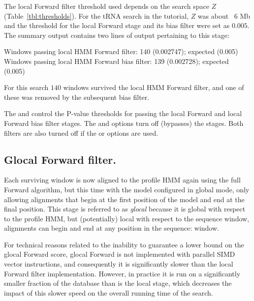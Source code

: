 \begin{sreoutput}
The local Forward filter threshold used depends on
the search space $Z$ (Table~\ref{tbl:thresholds}). For the tRNA search
in the tutorial, $Z$ was about ~$6$ Mb and the threshold for the local
Forward stage and its bias filter were set as $0.005$. The summary
output contains two lines of output pertaining to this stage:

\begin{sreoutput}
Windows   passing  local HMM Forward       filter:             140  (0.002747); expected (0.005)
Windows   passing  local HMM Forward  bias filter:             139  (0.002728); expected (0.005)
\end{sreoutput}

For this search $140$ windows survived the local HMM Forward filter,
and one of these was removed by the subsequent bias filter. 

The  and  control the P-value thresholds for
passing the local Forward and local Forward bias filter stages.  The
 and  options turn off (bypasses) the
stages. Both filters are also turned off if the  or
 options are used.

\subsection{Glocal Forward filter.}

Each surviving window is now aligned to the profile HMM again using the full
Forward algorithm, but this time with the model configured in global
mode, only allowing alignments that begin at the first position of the
model and end at the final position. This stage is referred to as
\emph{glocal} because it is global with respect to the profile HMM,
but (potentially) local with respect to the sequence window,
alignments can begin and end at any position in the sequence:
window. 

For technical reasons related to the inability to guarantee a lower
bound on the glocal Forward score, glocal Forward is not implemented
with parallel SIMD vector instructions, and consequently it is
significantly slower than the local Forward filter
implementation. However, in practice it is run on a significantly
smaller fraction of the database than is the local stage, which
decreases the impact of this slower speed on the overall running time
of the search. 


\end{sreoutput}
